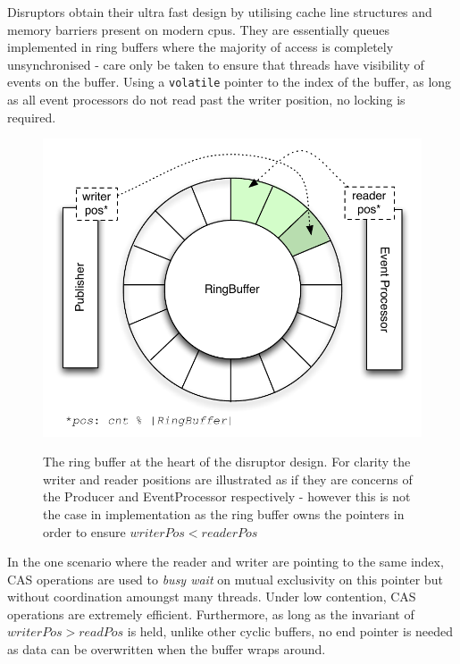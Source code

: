 \documentclass[a4paper,11pt]{scrreprt}
\begin{document}
Disruptors obtain their ultra fast design by utilising cache line structures and memory barriers present on modern cpus. They are essentially queues implemented in ring buffers where the majority of access is completely unsynchronised - care only be taken to ensure that threads have visibility of events on the buffer. Using a \texttt{volatile} pointer to the index of the buffer, as long as all event processors do not read past the writer position, no locking is required. 
\begin{figure}[h]
\centering
\caption{The ring buffer at the heart of the disruptor design. For clarity the writer and reader positions are illustrated as if they are concerns of the Producer and EventProcessor respectively - however this is not the case in implementation as the ring buffer owns the pointers in order to ensure \(writerPos < readerPos\)}
\includegraphics[scale=0.65, trim=0 10 0 0, clip=true] {ringbuffer.pdf}
\label{fig:ringbuffer}
\end{figure}

In the one scenario where the reader and writer are pointing to the same index, CAS operations are used to \textit{busy wait} on mutual exclusivity on this pointer but without coordination amoungst many threads. Under low contention, CAS operations are extremely efficient. Furthermore, as long as the invariant of \(writerPos > readPos\) is held, unlike other cyclic buffers, no end pointer is needed as data can be overwritten when the buffer wraps around.
\end{document}
